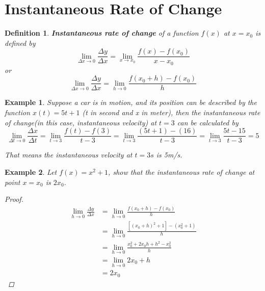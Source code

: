 \documentclass{article}
\newtheorem{definition}{Definition}
\newtheorem{ex}{Example}
\begin{document}
\section{Instantaneous Rate of Change}
\begin{definition}
	\textbf{Instantaneous rate of change} of a function $f(x)$ at $x=x_0$ is defined by
	\[ \lim_{\Delta x\to0} \frac{\Delta y}{\Delta x} = \lim_{x\to x_0}\frac{f(x)-f(x_0)}{x-x_0}\]
	or
	\[  \lim_{\Delta x\to0} \frac{\Delta y}{\Delta x} =\lim_{h\to0}\frac{f(x_0+h)-f(x_0)}{h} \]
\end{definition}

\begin{ex}
	Suppose a car is in motion, and its position can be described by the function $x(t)= 5t + 1$ (t in second and x in meter), then the instantaneous rate of change(in this case, instantaneous velocity) at $t=3$ can be calculated by 
	\[  \lim_{\Delta t\to0} \frac{\Delta x}{\Delta t}
	=\lim_{t\to 3}\frac{f(t)-f(3)}{t-3} 
	= \lim_{t\to 3}\frac{(5t+1) - (16)}{t-3} 
	= \lim_{t\to 3}\frac{5t-15}{t-3}
	= 5 \]
	
	That means the instantaneous velocity at $t=3s$ is 5m/s.   
\end{ex}

\begin{ex}
	Let $f(x) = x^2 + 1$, show that the instantaneous rate of change at point $x=x_0$ is $2x_0$.
	
	\begin{proof}
		\begin{align*}
		\lim_{h\to 0}\frac{\Delta y}{\Delta x} 
		&= \lim_{h\to 0}\frac{f(x_0+h)-f(x_0)}{h}\\
		&= \lim_{h\to 0}\frac{[(x_0+h)^2+1]-(x_0^2+1)}{h}\\
		&= \lim_{h\to 0}\frac{x_0^2+2x_0h+h^2 -x_0^2}{h}\\
		&= \lim_{h\to 0} 2x_0 + h\\
		&= 2x_0
		\end{align*}
	\end{proof}
\end{ex}
\end{document}

